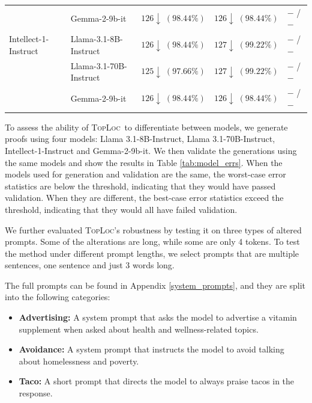 \documentclass{article}
\theoremstyle{plain}
\theoremstyle{definition}
\theoremstyle{remark}
\newcommand{\toploc}{\textsc{TopLoc}}
\begin{document}
\begin{table}[ht]
\begin{center}
\begin{small}
\begin{tabular}{p{3.8cm} p{3.8cm} p{2.2cm} p{2.2cm} p{2.3cm}}
 & Gemma-2-9b-it & $126\downarrow\;(98.44\%)$ & $126\downarrow\;(98.44\%)$ & $-$ / $-$ \\
Intellect-1-Instruct & Llama-3.1-8B-Instruct & $126\downarrow\;(98.44\%)$ & $127\downarrow\;(99.22\%)$ & $-$ / $-$ \\
 & Llama-3.1-70B-Instruct & $125\downarrow\;(97.66\%)$ & $127\downarrow\;(99.22\%)$ & $-$ / $-$ \\
 & Gemma-2-9b-it & $126\downarrow\;(98.44\%)$ & $126\downarrow\;(98.44\%)$ & $-$ / $-$ \\
\bottomrule
\end{tabular}
\end{small}
\end{center}
\end{table}

To assess the ability of \toploc\ to differentiate between models, we generate proofs using four models: Llama 3.1-8B-Instruct, Llama 3.1-70B-Instruct, Intellect-1-Instruct and Gemma-2-9b-it.
We then validate the generations using the same models and show the results in Table \ref{tab:model_errs}.
When the models used for generation and validation are the same, the worst-case error statistics are below the threshold, indicating that they would have passed validation.
When they are different, the best-case error statistics exceed the threshold, indicating that they would all have failed validation.

\label{altered_system_prompt_test}
We further evaluated \toploc's robustness by testing it on three types of altered prompts.
Some of the alterations are long, while some are only 4 tokens.
To test the method under different prompt lengths, we select prompts that are multiple sentences, one sentence and just 3 words long.

The full prompts can be found in Appendix \ref{system_prompts}, and they are split into the following categories:

\begin{itemize}
    \item \textbf{Advertising:} A system prompt that asks the model to advertise a vitamin supplement when asked about health and wellness-related topics.
    \item \textbf{Avoidance:} A system prompt that instructs the model to avoid talking about homelessness and poverty.
    \item \textbf{Taco:} A short prompt that directs the model to always praise tacos in the response.
\end{itemize}
\end{document}
